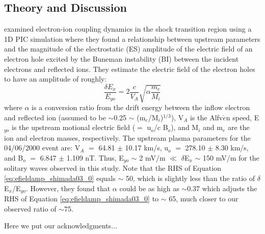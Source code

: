 \documentclass[grl]{AGUTeX}
\begin{document}
\begin{article}
\section{Theory and Discussion}  \label{sec:theory}
\indent  \citet{shimada03a} examined electron-ion coupling dynamics in the shock transition region using a 1D PIC simulation where they found a relationship between upstream parameters and the magnitude of the electrostatic (ES) amplitude of the electric field of an electron hole excited by the Buneman instability (BI) between the incident electrons and reflected ions.  They estimate the electric field of the electron holes to have an amplitude of roughly:
\begin{equation}
  \label{eq:efieldamp_shimada03_0}
  \frac{\delta E{\scriptstyle_{x}}}{ E{\scriptstyle_{yo}}} = 2 \frac{c}{V{\scriptstyle_{A}}} \sqrt{\alpha \frac{m{\scriptstyle_{e}}}{M{\scriptstyle_{i}}}}
\end{equation}
where $\alpha$ is a conversion ratio from the drift energy between the inflow electron and reflected ion (assumed to be $\sim$0.25 $\sim$ (m${\scriptstyle_{e}}$/M${\scriptstyle_{i}}$)$^{1/3}$), V${\scriptstyle_{A}}$ is the Alfv$\acute{e}$n speed, E${\scriptstyle_{yo}}$ is the upstream motional electric field ($=$ u${\scriptstyle_{o}}$/c B${\scriptstyle_{o}}$), and M${\scriptstyle_{i}}$ and m${\scriptstyle_{e}}$ are the ion and electron masses, respectively.  The upstream plasma parameters for the 04/06/2000 event are:  V${\scriptstyle_{A}}$ $=$ 64.81 $\pm$ 10.17 km/s, u${\scriptstyle_{o}}$ $=$ 278.10 $\pm$ 8.30 km/s, and B${\scriptstyle_{o}}$ $=$ 6.847 $\pm$ 1.109 nT.  Thus, E${\scriptstyle_{yo}}$ $\sim$ 2 mV/m $\ll$ $\delta$E${\scriptstyle_{x}}$ $\sim$ 150 mV/m for the solitary waves observed in this study.  Note that the RHS of Equation \ref{eq:efieldamp_shimada03_0} equals $\sim$ 50, which is slightly less than the ratio of $\delta$E${\scriptstyle_{x}}$/E${\scriptstyle_{yo}}$.  However, they found that $\alpha$ could be as high as $\sim$0.37 which adjusts the RHS of Equation \ref{eq:efieldamp_shimada03_0} to $\sim$ 65, much closer to our observed ratio of $\sim$75.  \\


\begin{acknowledgments}
  Here we put our acknowledgments...
\end{acknowledgments}


\end{article}
\end{document}
